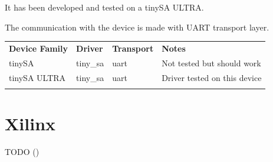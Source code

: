 It has been developed and tested on a tinySA ULTRA.

The communication with the device is made with UART transport layer.

\begin{tabularx}{16cm}{lllX}
\thickhline
\textbf{Device Family} & \textbf{Driver} & \textbf{Transport} & \textbf{Notes} \\
\thickhline
tinySA  & tiny\_sa & uart & Not tested but should work \\
\thinhline
tinySA ULTRA & tiny\_sa & uart & Driver tested on this device \\
\thickhline
\end{tabularx}

\section{Xilinx}
TODO ()
